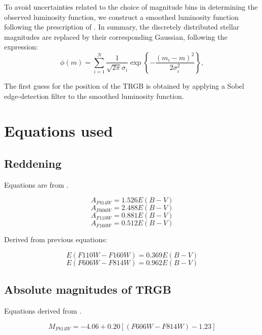 \documentclass[12,manuscript,usenatbib]{aastex}
\begin{document}
To avoid uncertainties related to the choice of magnitude bins in determining the observed luminosity function, we construct a smoothed luminosity function following the prescription of \citet{1996ApJ...461..713S}. In summary, the discretely distributed stellar magnitudes are replaced by their corresponding Gaussian, following the expression:
\begin{equation}
\phi(m) = \sum_{i=1}^{N} \frac{1}{\sqrt{2\pi}\sigma_{i}} \exp \left\{ - \frac{(m_i-m)^2}{2\sigma_i^2}\right\},
\end{equation}

The first guess for the position of the TRGB is obtained by applying a Sobel edge-detection filter to the smoothed luminosity function.


\section{Equations used}
\subsection{Reddening}
Equations are from \citet{2011ApJ...737..103S}.

\begin{equation}
A_{F814W} = 1.526 E(B-V)
\end{equation}
\begin{equation}
A_{F606W} = 2.488 E(B-V)
\end{equation}
\begin{equation}
A_{F110W} = 0.881E(B-V)
\end{equation}
\begin{equation}
A_{F160W} = 0.512 E(B-V)
\end{equation}

Derived from previous equations:

\begin{equation}
E(F110W-F160W) = 0.369 E(B-V)
\end{equation}
\begin{equation}
E(F606W-F814W) = 0.962 E(B-V)
\end{equation}

\subsection{Absolute magnitudes of TRGB}
Equations derived from \cite{2007ApJ...661..815R}.

\begin{equation}
M_{F814W} = -4.06 + 0.20 [(F606W-F814W) -1.23]
\end{equation}
\end{document}
